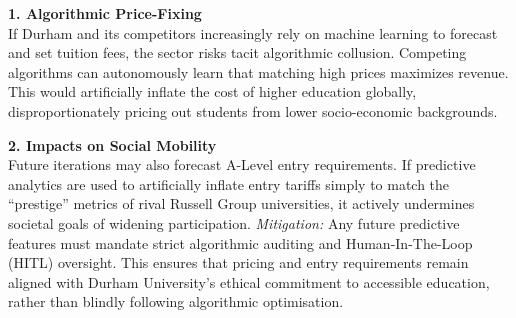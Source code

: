\noindent \textbf{1. Algorithmic Price-Fixing} \\
If Durham and its competitors increasingly rely on machine learning to forecast and set tuition fees, the sector risks tacit algorithmic collusion. Competing algorithms can autonomously learn that matching high prices maximizes revenue. This would artificially inflate the cost of higher education globally, disproportionately pricing out students from lower socio-economic backgrounds.

\noindent \textbf{2. Impacts on Social Mobility} \\
Future iterations may also forecast A-Level entry requirements. If predictive analytics are used to artificially inflate entry tariffs simply to match the ``prestige'' metrics of rival Russell Group universities, it actively undermines societal goals of widening participation. 
\textit{Mitigation:} Any future predictive features must mandate strict algorithmic auditing and Human-In-The-Loop (HITL) oversight. This ensures that pricing and entry requirements remain aligned with Durham University's ethical commitment to accessible education, rather than blindly following algorithmic optimisation.

